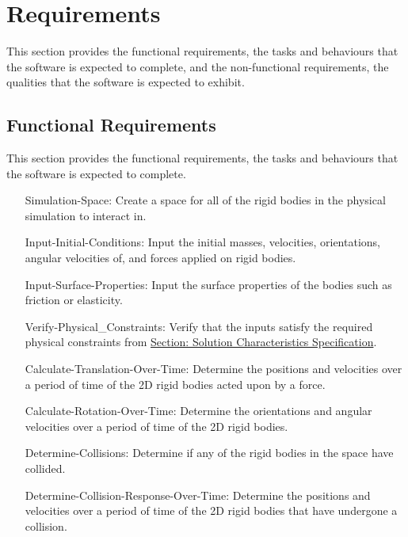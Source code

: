 \documentclass[12pt]{article}
\begin{document}
\section{Requirements}
\label{Sec:Requirements}
This section provides the functional requirements, the tasks and behaviours that the software is expected to complete, and the non-functional requirements, the qualities that the software is expected to exhibit.
\subsection{Functional Requirements}
\label{Sec:FRs}
This section provides the functional requirements, the tasks and behaviours that the software is expected to complete.
\begin{itemize}
\item[Simulation-Space:\phantomsection\label{simSpace}]{Create a space for all of the rigid bodies in the physical simulation to interact in.}
\item[Input-Initial-Conditions:\phantomsection\label{inputInitialConds}]{Input the initial masses, velocities, orientations, angular velocities of, and forces applied on rigid bodies.}
\item[Input-Surface-Properties:\phantomsection\label{inputSurfaceProps}]{Input the surface properties of the bodies such as friction or elasticity.}
\item[Verify-Physical\_Constraints:\phantomsection\label{verifyPhysCons}]{Verify that the inputs satisfy the required physical constraints from \hyperref[Sec:SolCharSpec]{Section: Solution Characteristics Specification}.}
\item[Calculate-Translation-Over-Time:\phantomsection\label{calcTransOverTime}]{Determine the positions and velocities over a period of time of the 2D rigid bodies acted upon by a force.}
\item[Calculate-Rotation-Over-Time:\phantomsection\label{calcRotOverTime}]{Determine the orientations and angular velocities over a period of time of the 2D rigid bodies.}
\item[Determine-Collisions:\phantomsection\label{deterColls}]{Determine if any of the rigid bodies in the space have collided.}
\item[Determine-Collision-Response-Over-Time:\phantomsection\label{deterCollRespOverTime}]{Determine the positions and velocities over a period of time of the 2D rigid bodies that have undergone a collision.}
\end{itemize}
\end{document}

